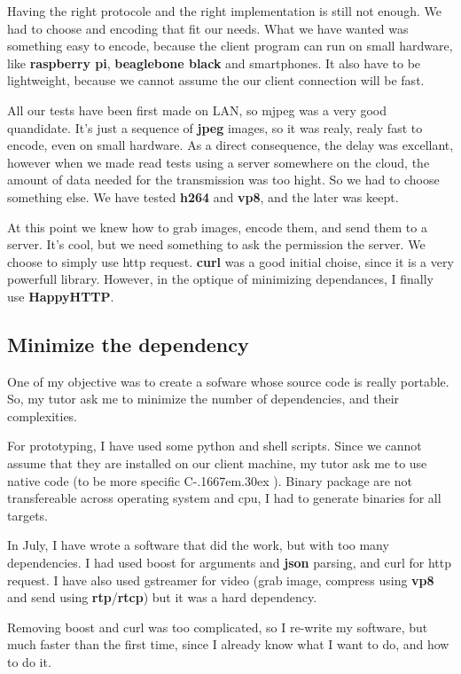 \documentclass[a4paper,11pt]{custom}
\newcommand{\rtp}{\textbf{rtp}}
\newcommand{\rtcp}{\textbf{rtcp}}
\newcommand{\curl}{\textbf{curl}}
\newcommand{\happyhttp}{\textbf{HappyHTTP}}
\newcommand{\jpeg}{\textbf{jpeg}}
\newcommand{\vpx}{\textbf{vp8}}
\newcommand{\mpeg}{\textbf{h264}}
\newcommand{\rpi}{\textbf{raspberry pi}}
\newcommand{\bbb}{\textbf{beaglebone black}}
\newcommand{\cpp}{%
  C\kern-.1667em\raise.30ex\hbox{\smaller{++}}%
  \spacefactor1000%
}
\newcommand{\json}{\textbf{json}}
\begin{document}
Having the right protocole and the right implementation is still not enough. We
had to choose and encoding that fit our needs. What we have wanted was something
easy to encode, because the client program can run on small hardware, like \rpi,
\bbb{} and smartphones. It also have to be lightweight, because we cannot assume
the our client connection will be fast.

All our tests have been first made on LAN, so mjpeg was a very good quandidate.
It's just a sequence of \jpeg{} images, so it was realy, realy fast to encode,
even on small hardware. As a direct consequence, the delay was excellant,
however when we made read tests using a server somewhere on the cloud, the
amount of data needed for the transmission was too hight. So we had to choose
something else. We have tested \mpeg{} and \vpx, and the later was keept.

At this point we knew how to grab images, encode them, and send them to a
server. It's cool, but we need something to ask the permission the server. We
choose to simply use http request. \curl{} was a good initial choise, since it
is a very powerfull library. However, in the optique of minimizing dependances,
I finally use \happyhttp.

\subsection{Minimize the dependency}

One of my objective was to create a sofware whose source code is really
portable. So, my tutor ask me to minimize the number of dependencies, and their
complexities.

For prototyping, I have used some python and shell scripts. Since we cannot
assume that they are installed on our client machine, my tutor ask me to use
native code (to be more specific \cpp). Binary package are not transfereable
across operating system and cpu, I had to generate binaries for all targets.

In July, I have wrote a software that did the work, but with too many
dependencies. I had used boost for arguments and \json{} parsing, and curl for http
request. I have also used gstreamer for video (grab image, compress using \vpx{}
and send using \rtp/\rtcp) but it was a hard dependency.

Removing boost and curl was too complicated, so I re-write my software, but much
faster than the first time, since I already know what I want to do, and how to
do it.
\end{document}
